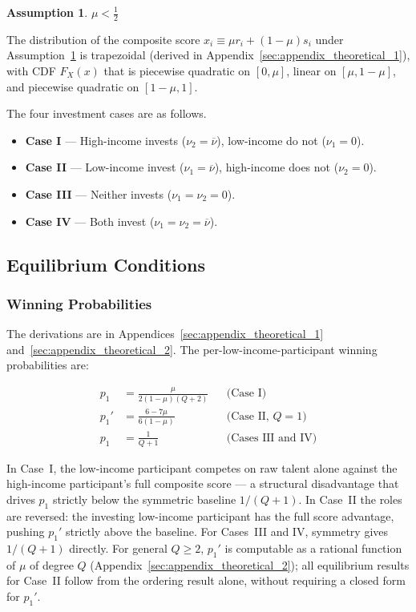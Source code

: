 \documentclass[
    oneside,
    fontsize=10pt,leqno]{article}
\newtheorem{assumption}{Assumption}
\begin{document}
\begin{assumption}
\label{assu:mu_less_than_half}$\mu<\frac{1}{2}$
\end{assumption}

\noindent The distribution of the composite score $x_{i}\equiv\mu
r_{i}+(1-\mu)s_{i}$ under Assumption~\ref{assu:mu_less_than_half}
is trapezoidal (derived in Appendix~\ref{sec:appendix_theoretical_1}),
with CDF $F_{X}(x)$ that is piecewise quadratic on $[0,\mu]$, linear
on $[\mu,1-\mu]$, and piecewise quadratic on $[1-\mu,1]$.

The four investment cases are as follows.

\begin{itemize}
\item \textbf{Case I} --- High-income invests ($\nu_{2}=\overline{\nu}$), low-income
do not ($\nu_{1}=0$).
\item \textbf{Case II} --- Low-income invest ($\nu_{1}=\overline{\nu}$), high-income
does not ($\nu_{2}=0$).
\item \textbf{Case III} --- Neither invests ($\nu_{1}=\nu_{2}=0$).
\item \textbf{Case IV} --- Both invest ($\nu_{1}=\nu_{2}=\overline{\nu}$).
\end{itemize}

\subsection{\label{subsec:Two-player-Discrete-Model}Equilibrium Conditions}

\noindent

\subsubsection{Winning Probabilities}

The derivations are in Appendices~\ref{sec:appendix_theoretical_1}
and~\ref{sec:appendix_theoretical_2}. The per-low-income-participant
winning probabilities are:

\begin{align}
p_{1} & =\frac{\mu}{2(1-\mu)(Q+2)} & & \text{(Case I)}\label{eq:p1_caseI}\\[4pt]
p_{1}' & =\frac{6-7\mu}{6(1-\mu)} & & \text{(Case II, }Q=1\text{)}\label{eq:p1prime_Q1}\\[4pt]
p_{1} & =\frac{1}{Q+1} & & \text{(Cases III and IV)}\label{eq:p_baseline}
\end{align}

In Case~I, the low-income participant competes on raw talent alone
against the high-income participant's full composite score --- a
structural disadvantage that drives $p_{1}$ strictly below the
symmetric baseline $1/(Q+1)$. In Case~II the roles are reversed:
the investing low-income participant has the full score advantage,
pushing $p_{1}'$ strictly above the baseline. For Cases~III and IV,
symmetry gives $1/(Q+1)$ directly. For general $Q\geq2$, $p_{1}'$
is computable as a rational function of $\mu$ of degree $Q$
(Appendix~\ref{sec:appendix_theoretical_2}); all equilibrium
results for Case~II follow from the ordering result alone, without
requiring a closed form for $p_{1}'$.
\end{document}

